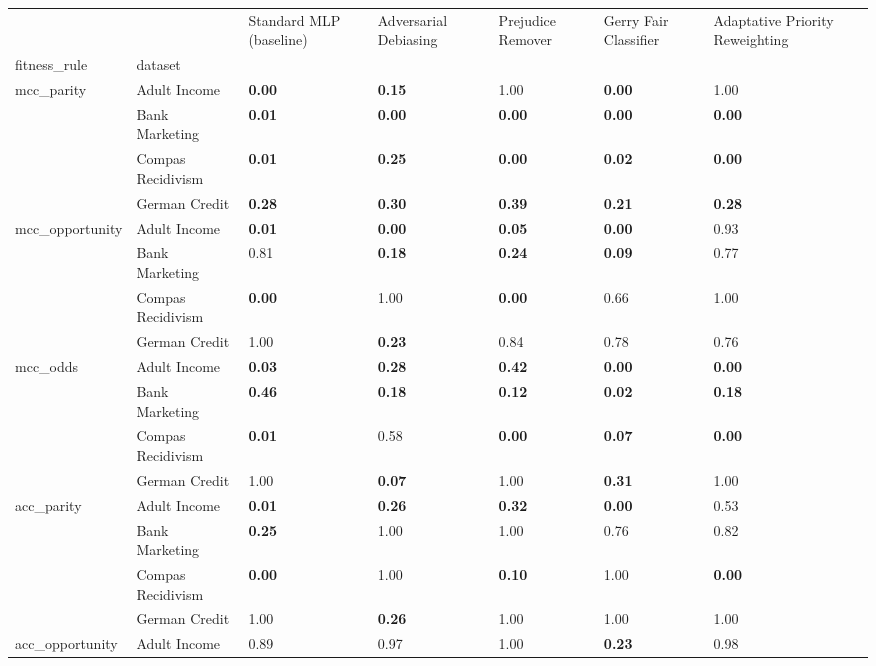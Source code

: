\begin{tabular}{lllllll}
\toprule
 &  & Standard MLP (baseline) & Adversarial Debiasing & Prejudice Remover & Gerry Fair Classifier & Adaptative Priority Reweighting \\
fitness_rule & dataset &  &  &  &  &  \\
\midrule
\multirow[t]{4}{*}{mcc_parity} & Adult Income & \textbf{0.00} & \textbf{0.15} & 1.00 & \textbf{0.00} & 1.00 \\
 & Bank Marketing & \textbf{0.01} & \textbf{0.00} & \textbf{0.00} & \textbf{0.00} & \textbf{0.00} \\
 & Compas Recidivism & \textbf{0.01} & \textbf{0.25} & \textbf{0.00} & \textbf{0.02} & \textbf{0.00} \\
 & German Credit & \textbf{0.28} & \textbf{0.30} & \textbf{0.39} & \textbf{0.21} & \textbf{0.28} \\
\cline{1-7}
\multirow[t]{4}{*}{mcc_opportunity} & Adult Income & \textbf{0.01} & \textbf{0.00} & \textbf{0.05} & \textbf{0.00} & 0.93 \\
 & Bank Marketing & 0.81 & \textbf{0.18} & \textbf{0.24} & \textbf{0.09} & 0.77 \\
 & Compas Recidivism & \textbf{0.00} & 1.00 & \textbf{0.00} & 0.66 & 1.00 \\
 & German Credit & 1.00 & \textbf{0.23} & 0.84 & 0.78 & 0.76 \\
\cline{1-7}
\multirow[t]{4}{*}{mcc_odds} & Adult Income & \textbf{0.03} & \textbf{0.28} & \textbf{0.42} & \textbf{0.00} & \textbf{0.00} \\
 & Bank Marketing & \textbf{0.46} & \textbf{0.18} & \textbf{0.12} & \textbf{0.02} & \textbf{0.18} \\
 & Compas Recidivism & \textbf{0.01} & 0.58 & \textbf{0.00} & \textbf{0.07} & \textbf{0.00} \\
 & German Credit & 1.00 & \textbf{0.07} & 1.00 & \textbf{0.31} & 1.00 \\
\cline{1-7}
\multirow[t]{4}{*}{acc_parity} & Adult Income & \textbf{0.01} & \textbf{0.26} & \textbf{0.32} & \textbf{0.00} & 0.53 \\
 & Bank Marketing & \textbf{0.25} & 1.00 & 1.00 & 0.76 & 0.82 \\
 & Compas Recidivism & \textbf{0.00} & 1.00 & \textbf{0.10} & 1.00 & \textbf{0.00} \\
 & German Credit & 1.00 & \textbf{0.26} & 1.00 & 1.00 & 1.00 \\
\cline{1-7}
\multirow[t]{4}{*}{acc_opportunity} & Adult Income & 0.89 & 0.97 & 1.00 & \textbf{0.23} & 0.98 \\

\end{tabular}
